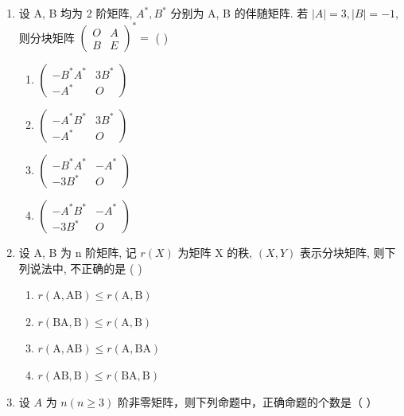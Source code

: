 \documentclass[12pt, a4paper]{ctexart}
\begin{document}
\begin{enumerate}
    \item 设 A, B 均为 2 阶矩阵, $ A^{*}, B^{*} $ 分别为 A, B 的伴随矩阵. 若 $ |A| = 3, |B| = -1 $, 则分块矩阵 $ \begin{pmatrix} O & A \\ B & E \end{pmatrix}^{*} = $ ( \underline{\hspace{1cm}} )
    \begin{enumerate}[label=(\Alph*)]
        \item $ \begin{pmatrix}-B^{*}A^{*}&3B^{*}\\-A^{*}&O\end{pmatrix} $
        \item $ \begin{pmatrix}-A^{*}B^{*}&3B^{*}\\-A^{*}&O\end{pmatrix} $
        \item $ \begin{pmatrix}-B^{*}A^{*}&-A^{*}\\-3B^{*}&O\end{pmatrix} $
        \item $ \begin{pmatrix}-A^{*}B^{*}&-A^{*}\\-3B^{*}&O\end{pmatrix} $
    \end{enumerate}

    \item 设 A, B 为 n 阶矩阵, 记 $ r(X) $ 为矩阵 X 的秩, $ (X, Y) $ 表示分块矩阵, 则下列说法中, 不正确的是 ( \underline{\hspace{1cm}} )
    \begin{enumerate}[label=(\Alph*)]
        \item $ r(\mathrm{A},\mathrm{AB}) \leq r(\mathrm{A},\mathrm{B}) $
        \item $ r(\mathrm{BA},\mathrm{B}) \leq r(\mathrm{A},\mathrm{B}) $
        \item $ r(\mathrm{A},\mathrm{AB}) \leq r(\mathrm{A},\mathrm{BA}) $
        \item $ r(\mathrm{AB},\mathrm{B}) \leq r(\mathrm{BA},\mathrm{B}) $
    \end{enumerate}

    \item 设 $ A $ 为 $ n(n \geq 3) $ 阶非零矩阵，则下列命题中，正确命题的个数是（ \underline{\hspace{1cm}} ）
    

\end{enumerate}
\end{document}
